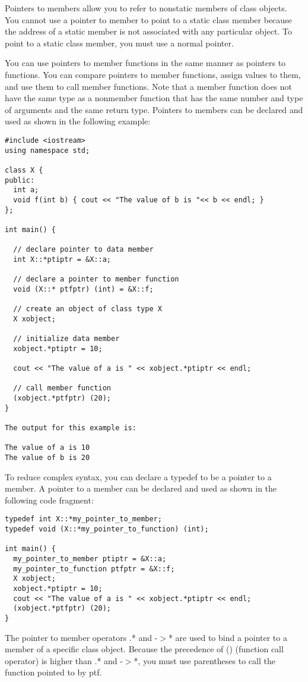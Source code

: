 \documentclass{book}
\begin{document}
Pointers to members allow you to refer to nonstatic members of class objects.
You cannot use a pointer to member to point to a static class member because the address of a static member is not associated with any particular object. 
To point to a static class member, you must use a normal pointer.

You can use pointers to member functions in the same manner as pointers to functions.
You can compare pointers to member functions, assign values to them, and use them to call member functions.
Note that a member function does not have the same type as a nonmember function that has the same number and type of arguments and the same return type.
Pointers to members can be declared and used as shown in the following example:
\begin{lstlisting}
#include <iostream>
using namespace std;

class X {
public:
  int a;
  void f(int b) { cout << "The value of b is "<< b << endl; }
};

int main() {

  // declare pointer to data member
  int X::*ptiptr = &X::a;

  // declare a pointer to member function
  void (X::* ptfptr) (int) = &X::f;

  // create an object of class type X
  X xobject;

  // initialize data member
  xobject.*ptiptr = 10;

  cout << "The value of a is " << xobject.*ptiptr << endl;

  // call member function
  (xobject.*ptfptr) (20);
}

The output for this example is:

The value of a is 10
The value of b is 20

\end{lstlisting}
To reduce complex syntax, you can declare a typedef to be a pointer to a member. A pointer to a member can be declared and used as shown in the following code fragment:

\begin{lstlisting}
typedef int X::*my_pointer_to_member;
typedef void (X::*my_pointer_to_function) (int);

int main() {
  my_pointer_to_member ptiptr = &X::a;
  my_pointer_to_function ptfptr = &X::f;
  X xobject;
  xobject.*ptiptr = 10;
  cout << "The value of a is " << xobject.*ptiptr << endl;
  (xobject.*ptfptr) (20);
}

\end{lstlisting}
The pointer to member operators .* and -$>$* are used to bind a pointer to a member of a specific class object.
Because the precedence of () (function call operator) is higher than .* and -$>$*, you must use parentheses to call the function pointed to by ptf.
\end{document}

